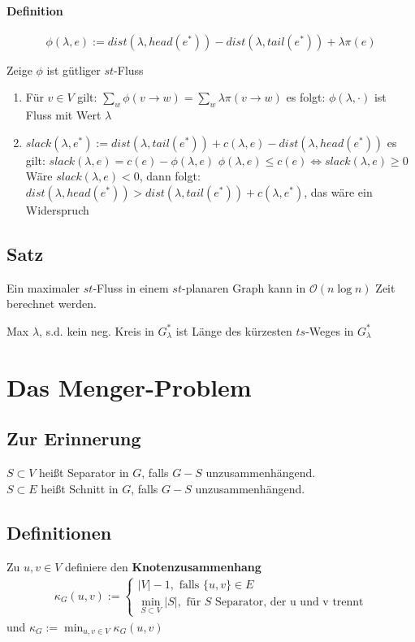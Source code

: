 \documentclass{article}
\newcommand{\df}[1]{\textbf{#1}\index{#1}}
\renewcommand{\O}[1]{\mathcal{O}\left(#1\right)}
\begin{document}
\paragraph{Definition}
\[\phi(\lambda, e) := dist(\lambda, head(e^*)) - dist(\lambda, tail(e^*)) + \lambda \pi(e) \]

Zeige $\phi$ ist gütliger $st$-Fluss
\begin{enumerate}
	\item Für $v \in V$ gilt: $\sum_{w}\phi(v \rightarrow w) = \sum_{w}\lambda \pi(v \rightarrow w)$
	es folgt: $\phi(\lambda, \cdot)$ ist Fluss mit Wert $\lambda$
	\item $slack(\lambda, e^*) := dist(\lambda, tail(e^*)) + c(\lambda, e) - dist(\lambda, head(e^*)) $
	es gilt: $slack(\lambda, e) = c(e) - \phi(\lambda, e)$
	$\phi(\lambda, e) \leq c(e) \Longleftrightarrow slack(\lambda, e) \geq 0$
	Wäre $slack(\lambda, e) < 0$, dann folgt: $dist(\lambda, head(e^*)) > dist(\lambda, tail(e^*)) + c(\lambda, e^*)$, das wäre ein Widerspruch
\end{enumerate}

\subsection{Satz}
Ein maximaler $st$-Fluss in einem $st$-planaren Graph kann in $\O{n\log n}$ Zeit berechnet werden.

Max $\lambda$, s.d. kein neg. Kreis in $G^*_\lambda$ ist Länge des kürzesten $ts$-Weges in $G^*_\lambda$

\newpage
\section{Das Menger-Problem}

\subsection{Zur Erinnerung}
$S \subset V$ heißt Separator in $G$, falls $G - S$ unzusammenhängend.\\
$S\subset E$ heißt Schnitt in $G$, falls $G - S$ unzusammenhängend.


\subsection{Definitionen}
Zu $u,v \in V$ definiere den \df{Knotenzusammenhang}
\begin{align*}
\kappa_G(u,v) := \left\lbrace \begin{aligned}
|V| - 1, \text{ falls }\{u,v\} \in E\\
\min_{S\subset V}|S|, \text{ für } S \text{ Separator, der u und v trennt}
\end{aligned} \right.
\end{align*}
und $\kappa_G := \min_{u,v\in V}\kappa_G(u,v)$
\end{document}
